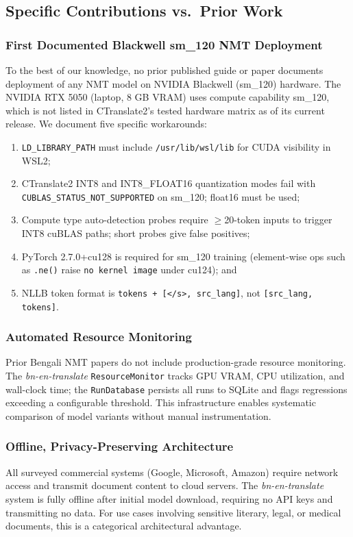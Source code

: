 \documentclass[conference]{IEEEtran}
\begin{document}
\subsection{Specific Contributions vs.\ Prior Work}

\subsubsection{First Documented Blackwell sm\_120 NMT Deployment}
To the best of our knowledge, no prior published guide or paper documents
deployment of any NMT model on NVIDIA Blackwell (sm\_120) hardware.
The NVIDIA RTX 5050 (laptop, 8 GB VRAM) uses compute capability sm\_120,
which is not listed in CTranslate2's tested hardware matrix as of its
current release.
We document five specific workarounds:
\begin{enumerate}
  \item \texttt{LD\_LIBRARY\_PATH} must include \texttt{/usr/lib/wsl/lib}
    for CUDA visibility in WSL2;
  \item CTranslate2 INT8 and INT8\_FLOAT16 quantization modes fail with
    \texttt{CUBLAS\_STATUS\_NOT\_SUPPORTED} on sm\_120; float16 must be
    used;
  \item Compute type auto-detection probes require $\ge$20-token inputs
    to trigger INT8 cuBLAS paths; short probes give false positives;
  \item PyTorch 2.7.0+cu128 is required for sm\_120 training (element-wise
    ops such as \texttt{.ne()} raise \texttt{no kernel image} under
    cu124); and
  \item NLLB token format is \texttt{tokens + [</s>, src\_lang]}, not
    \texttt{[src\_lang, tokens]}.
\end{enumerate}

\subsubsection{Automated Resource Monitoring}
Prior Bengali NMT papers do not include production-grade resource
monitoring.
The \textit{bn-en-translate} \texttt{ResourceMonitor} tracks GPU VRAM,
CPU utilization, and wall-clock time; the \texttt{RunDatabase} persists
all runs to SQLite and flags regressions exceeding a configurable
threshold.
This infrastructure enables systematic comparison of model variants
without manual instrumentation.

\subsubsection{Offline, Privacy-Preserving Architecture}
All surveyed commercial systems (Google, Microsoft, Amazon) require
network access and transmit document content to cloud servers.
The \textit{bn-en-translate} system is fully offline after initial
model download, requiring no API keys and transmitting no data.
For use cases involving sensitive literary, legal, or medical documents,
this is a categorical architectural advantage.
\end{document}
